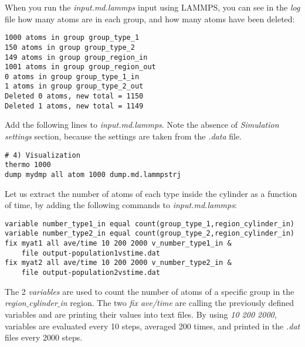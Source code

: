 {\color{red}When you run the \textit{input.md.lammps} input using LAMMPS, you can see in the \textit{log} file how many atoms are in each group, and how many atoms have been deleted:}
\begin{verbatim}
1000 atoms in group group_type_1
150 atoms in group group_type_2
149 atoms in group group_region_in
1001 atoms in group group_region_out
0 atoms in group group_type_1_in
1 atoms in group group_type_2_out
Deleted 0 atoms, new total = 1150
Deleted 1 atoms, new total = 1149
\end{verbatim}
Add the following lines to \textit{input.md.lammps}. Note the absence of \textit{Simulation settings} section, because the settings are taken from the \textit{.data} file.
\begin{verbatim}
# 4) Visualization
thermo 1000
dump mydmp all atom 1000 dump.md.lammpstrj
\end{verbatim}
Let us extract the number of atoms of each type inside the cylinder as a function of time, by adding the following commands to \textit{input.md.lammps}:
\begin{verbatim}
variable number_type1_in equal count(group_type_1,region_cylinder_in)
variable number_type2_in equal count(group_type_2,region_cylinder_in)
fix myat1 all ave/time 10 200 2000 v_number_type1_in &
    file output-population1vstime.dat
fix myat2 all ave/time 10 200 2000 v_number_type2_in &
    file output-population2vstime.dat
\end{verbatim}
The 2 \textit{variables} are used to count the number of atoms of a specific group in the \textit{region$\_$cylinder$\_$in} region. The two \textit{fix ave/time} are calling the previously defined variables and are printing their values into text files. By using \textit{10 200 2000}, variables are evaluated every 10 steps, averaged 200 times, and printed in the \textit{.dat} files every 2000 steps.


